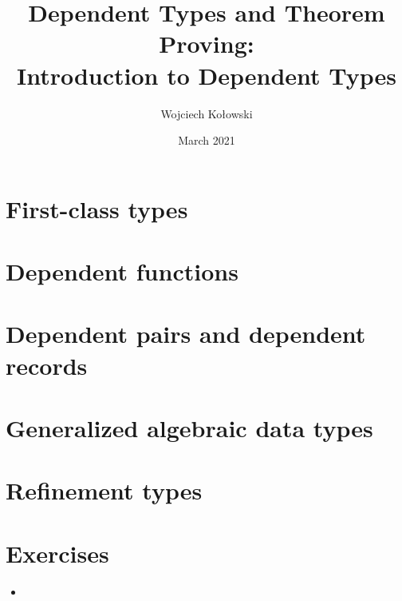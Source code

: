 \documentclass{beamer}
\title{Dependent Types and Theorem Proving: \\Introduction to Dependent Types}
\author{Wojciech Kołowski}
\date{March 2021}
\begin{document}
\frame{\titlepage}
\frame{\tableofcontents}

\section{First-class types}
\section{Dependent functions}
\section{Dependent pairs and dependent records}
\section{Generalized algebraic data types}
\section{Refinement types}
\section{Exercises}

\begin{frame}{}
\begin{itemize}
	\item 
\end{itemize}
\end{frame}
\end{document}

